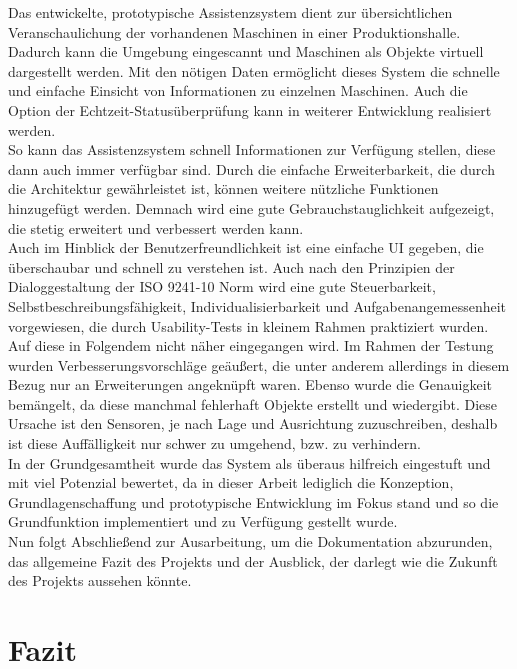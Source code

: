 Das entwickelte, prototypische Assistenzsystem dient zur übersichtlichen Veranschaulichung der vorhandenen Maschinen in einer Produktionshalle. Dadurch kann die 
Umgebung eingescannt und Maschinen als Objekte virtuell dargestellt werden. Mit den nötigen Daten ermöglicht dieses System die schnelle und einfache 
Einsicht von Informationen zu einzelnen Maschinen. Auch die Option der Echtzeit-Statusüberprüfung kann in weiterer Entwicklung realisiert werden. 
\\ 
So kann das Assistenzsystem schnell Informationen zur Verfügung stellen, diese dann auch immer verfügbar sind. Durch die einfache Erweiterbarkeit, die 
durch die Architektur gewährleistet ist, können weitere nützliche Funktionen hinzugefügt werden. Demnach wird eine gute Gebrauchstauglichkeit aufgezeigt, die 
stetig erweitert und verbessert werden kann.
\\ 
Auch im Hinblick der Benutzerfreundlichkeit ist eine einfache \acs{UI} gegeben, die überschaubar und schnell zu verstehen ist. Auch nach den Prinzipien der 
Dialoggestaltung der ISO 9241-10 Norm wird eine gute Steuerbarkeit, Selbstbeschreibungsfähigkeit, Individualisierbarkeit und Aufgabenangemessenheit vorgewiesen, 
die durch Usability-Tests in kleinem Rahmen praktiziert wurden. Auf diese in Folgendem nicht näher eingegangen wird. Im Rahmen der Testung wurden 
Verbesserungsvorschläge geäußert, die unter anderem allerdings in diesem Bezug nur an Erweiterungen angeknüpft waren. Ebenso wurde die Genauigkeit bemängelt, da 
diese manchmal fehlerhaft Objekte erstellt und wiedergibt. Diese Ursache ist den Sensoren, je nach Lage und Ausrichtung zuzuschreiben, deshalb ist diese 
Auffälligkeit nur schwer zu umgehend, bzw. zu verhindern. 
\\ 
In der Grundgesamtheit wurde das System als überaus hilfreich eingestuft und mit viel Potenzial bewertet, da in dieser Arbeit lediglich die Konzeption, 
Grundlagenschaffung und prototypische Entwicklung im Fokus stand und so die Grundfunktion implementiert und zu Verfügung gestellt wurde.
\\ 
\linebreak
Nun folgt Abschließend zur Ausarbeitung, um die Dokumentation abzurunden, das allgemeine Fazit des Projekts und der Ausblick, der darlegt wie die Zukunft des 
Projekts aussehen könnte. 

\chapter{Fazit}
\label{chap:Fazit}

